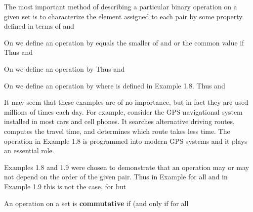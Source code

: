 \documentclass[11pt,oneside]{article}
\begin{document}
\begin{BookBody}

The most important method of describing a particular binary operation \BookInline{\ast } on a given set is to characterize the element  assigned to each pair  by some property defined in terms of  and 

 On  we define an operation \BookInline{\ast } by  equals the smaller of  and  or the common value if  Thus  and \BookEnd{\blacktriangle}

 On  we define an operation \BookInline{\ast ^{\prime }} by  Thus  and \BookEnd{\blacktriangle}

 On  we define an operation \BookInline{\ast ^{\prime \prime }} by  where \BookInline{\ast } is defined in Example 1.8. Thus  and \BookEnd{\blacktriangle}

It may seem that these examples are of no importance, but in fact they are used millions of times each day. For example, consider the GPS navigational system installed in most cars and cell phones. It searches alternative driving routes, computes the travel time, and determines which route takes less time. The operation in Example 1.8 is programmed into modern GPS systems and it plays an essential role.

Examples 1.8 and 1.9 were chosen to demonstrate that an operation may or may not depend on the order of the given pair. Thus in Example  for all  and in Example 1.9 this is not the case, for  but 

 An operation \BookInline{\ast } on a set  is\textbf{ commutative} if (and only if for all \BookEnd{\blacksquare}


\end{BookBody}
\end{document}
